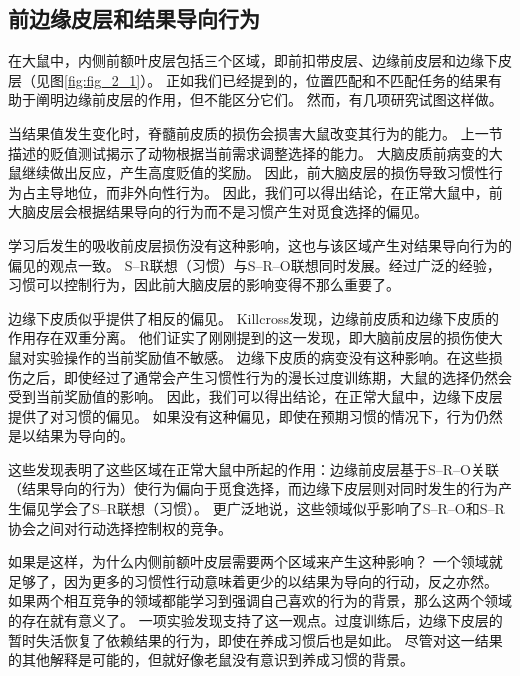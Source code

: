 \subsection{前边缘皮层和结果导向行为}

在大鼠中，内侧前额叶皮层包括三个区域，即前扣带皮层、边缘前皮层和边缘下皮层（见图\ref{fig:fig_2_1}）。
正如我们已经提到的，位置匹配和不匹配任务的结果有助于阐明边缘前皮层的作用，但不能区分它们。
然而，有几项研究试图这样做。\par


当结果值发生变化时，脊髓前皮质的损伤会损害大鼠改变其行为的能力。
上一节描述的贬值测试揭示了动物根据当前需求调整选择的能力。
大脑皮质前病变的大鼠继续做出反应，产生高度贬值的奖励。
因此，前大脑皮层的损伤导致习惯性行为占主导地位，而非外向性行为\cite{balleine1998goal,corbit2003role}。
因此，我们可以得出结论，在正常大鼠中，前大脑皮层会根据结果导向的行为而不是习惯产生对觅食选择的偏见。\par


学习后发生的吸收前皮层损伤没有这种影响\cite{ostlund2005lesions}，这也与该区域产生对结果导向行为的偏见的观点一致。
S–R联想（习惯）与S–R–O联想同时发展。经过广泛的经验，习惯可以控制行为，因此前大脑皮层的影响变得不那么重要了。\par


边缘下皮质似乎提供了相反的偏见。
Killcross\cite{killcross2003coordination}发现，边缘前皮质和边缘下皮质的作用存在双重分离。
他们证实了刚刚提到的这一发现，即大脑前皮层的损伤使大鼠对实验操作的当前奖励值不敏感。
边缘下皮质的病变没有这种影响。在这些损伤之后，即使经过了通常会产生习惯性行为的漫长过度训练期，大鼠的选择仍然会受到当前奖励值的影响。
因此，我们可以得出结论，在正常大鼠中，边缘下皮层提供了对习惯的偏见。
如果没有这种偏见，即使在预期习惯的情况下，行为仍然是以结果为导向的。\par


这些发现表明了这些区域在正常大鼠中所起的作用：边缘前皮层基于S–R–O关联（结果导向的行为）使行为偏向于觅食选择，而边缘下皮层则对同时发生的行为产生偏见学会了S–R联想（习惯）。
更广泛地说，这些领域似乎影响了S–R–O和S–R协会之间对行动选择控制权的竞争。\par


如果是这样，为什么内侧前额叶皮层需要两个区域来产生这种影响？
一个领域就足够了，因为更多的习惯性行动意味着更少的以结果为导向的行动，反之亦然。
如果两个相互竞争的领域都能学习到强调自己喜欢的行为的背景，那么这两个领域的存在就有意义了。
一项实验发现支持了这一观点。过度训练后，边缘下皮层的暂时失活恢复了依赖结果的行为，即使在养成习惯后也是如此\cite{coutureau2003inactivation}。
尽管对这一结果的其他解释是可能的，但就好像老鼠没有意识到养成习惯的背景。\par


